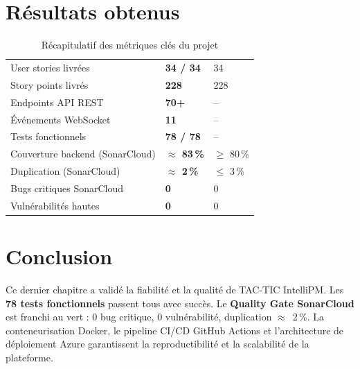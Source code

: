 \section{Résultats obtenus}

\begin{table}[H]
  \centering
  \caption{Récapitulatif des métriques clés du projet}
  \label{tab:resultats}
  \begin{tabularx}{\textwidth}{L{5cm}C{3cm}C{3cm}}
    \toprule
     &  &  \\
    \midrule
    User stories livrées          & \textbf{34 / 34}   & 34 \\
    Story points livrés           & \textbf{228}        & 228 \\
    Endpoints API REST             & \textbf{70+}        & -- \\
    Événements WebSocket           & \textbf{11}         & -- \\
    Tests fonctionnels             & \textbf{78 / 78}   & -- \\
    Couverture backend (SonarCloud)& \textbf{$\approx$ 83\,\%} & $\geq$ 80\,\% \\
    Duplication (SonarCloud)       & \textbf{$\approx$ 2\,\%}  & $\leq$ 3\,\% \\
    Bugs critiques SonarCloud      & \textbf{0}          & 0 \\
    Vulnérabilités hautes          & \textbf{0}          & 0 \\
    \bottomrule
  \end{tabularx}
\end{table}

\section{Conclusion}

\begin{chapconclusion}
Ce dernier chapitre a validé la fiabilité et la qualité de TAC-TIC IntelliPM.
Les \textbf{78 tests fonctionnels} passent tous avec succès. Le
\textbf{Quality Gate SonarCloud} est franchi au vert : 0 bug critique,
0 vulnérabilité, duplication $\approx$~2\,\%. La conteneurisation Docker,
le pipeline CI/CD GitHub Actions et l'architecture de déploiement Azure
garantissent la reproductibilité et la scalabilité de la plateforme.
\end{chapconclusion}
